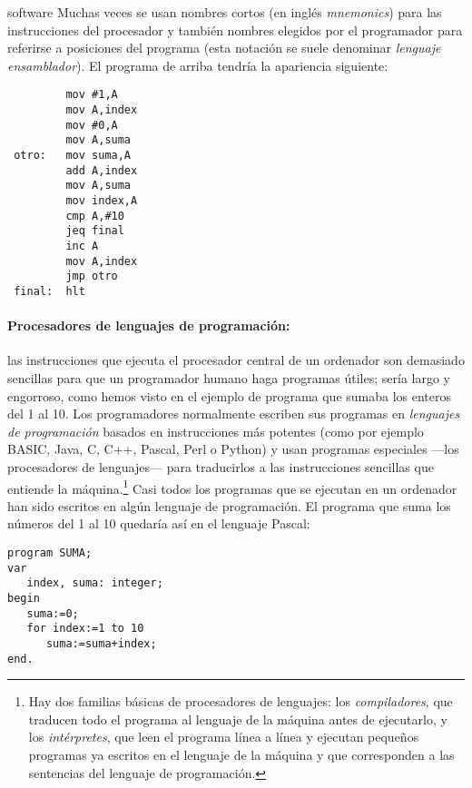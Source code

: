 \begin{persabermes}{software}
Muchas veces se usan nombres cortos (en inglés \emph{mnemonics}) para las instrucciones del procesador y también nombres elegidos por el programador para referirse a posiciones del programa (esta notación se suele denominar \emph{lenguaje ensamblador}). El programa de arriba tendría la apariencia siguiente: 
\begin{verbatim} 
         mov #1,A
         mov A,index
         mov #0,A
         mov A,suma
 otro:   mov suma,A
         add A,index
         mov A,suma
         mov index,A
         cmp A,#10
         jeq final
         inc A
         mov A,index
         jmp otro
 final:  hlt
\end{verbatim}


\paragraph{Procesadores de lenguajes de programación:} las instrucciones que ejecuta el procesador central de un ordenador son demasiado sencillas para que un programador humano haga programas útiles; sería largo y engorroso, como hemos visto en el ejemplo de programa que sumaba los enteros del 1 al 10. Los programadores normalmente escriben sus programas en {\em lenguajes de programación} basados en instrucciones más potentes (como por ejemplo BASIC, Java, C, C++, Pascal, Perl o Python) y usan programas especiales ---los procesadores de lenguajes--- para traducirlos a las instrucciones sencillas que entiende la máquina.\footnote{Hay dos familias básicas de procesadores de lenguajes: los \emph{compiladores}, que traducen todo el programa al lenguaje de la máquina antes de ejecutarlo, y los \emph{intérpretes}, que leen el programa línea a línea y ejecutan pequeños programas ya escritos en el lenguaje de la máquina y que corresponden a las sentencias del lenguaje de programación.} Casi todos los programas que se ejecutan en un ordenador han sido escritos en algún lenguaje de programación. El programa que suma los números del 1 al 10 quedaría así en el lenguaje Pascal: 
\begin{verbatim}
program SUMA;
var
   index, suma: integer;
begin
   suma:=0;
   for index:=1 to 10
      suma:=suma+index;
end.
\end{verbatim}


\end{persabermes}
